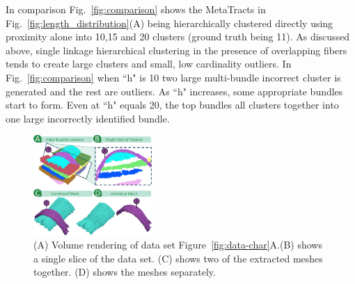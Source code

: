 In comparison Fig.~\ref{fig:comparison} shows the MetaTracts in Fig.~\ref{fig:length_distribution}(A) being hierarchically clustered directly using proximity alone into 10,15 and 20 clusters (ground truth being 11). As discussed above, single linkage hierarchical clustering in the presence of overlapping fibers tends to create large clusters and small, low cardinality outliers. In Fig.~\ref{fig:comparison} when ``h" is 10 two large multi-bundle incorrect cluster is generated and the rest are outliers. As ``h" increases, some appropriate bundles start to form. Even at ``h" equals 20, the top bundles all clusters together into one large incorrectly identified bundle.
\begin{figure}
\centering
		\includegraphics[width=0.4\textwidth]{images_pvis/figure7}
	\caption{(A) Volume rendering of data set Figure~\ref{fig:data-char}A.(B) shows a single slice of the data set. (C) shows two of the extracted meshes together. (D) shows the meshes separately.}
	\label{fig:crop-16-decomp}
\end{figure}  
  
